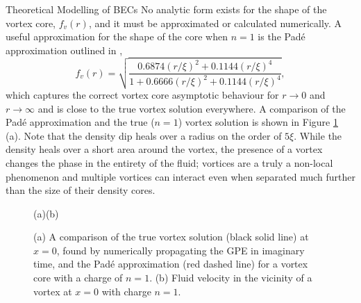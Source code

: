 \begin{chapter}{\label{cha:theoretical_model}Theoretical Modelling of BECs}
No analytic form exists for the shape of the vortex core, $f_v(r)$, and it must be approximated or calculated numerically. A useful approximation for the shape of the core when $n=1$ is the Pad\'e approximation outlined in \cite{berloff2004},
	\begin{equation}
		f_v(r) = \sqrt{\frac{0.6874(r/\xi)^2 + 0.1144(r/\xi)^4}{1+0.6666(r/\xi)^2+0.1144(r/\xi)^4}},
	\end{equation}
which captures the correct vortex core asymptotic behaviour for $r\rightarrow 0$ and $r\rightarrow\infty$ and is close to the true vortex solution everywhere. A comparison of the Pad\'e approximation and the true ($n=1$) vortex solution is shown in Figure \ref{fig_vortex} (a). Note that the density dip heals over a radius on the order of $5\xi$. While the density heals over a short area around the vortex, the presence of a vortex changes the phase in the entirety of the fluid; vortices are a truly a non-local phenomenon and multiple vortices can interact even when separated much further than the size of their density cores.

\begin{figure}[!ht]
	\hspace{-0.13\linewidth}(a)\hspace{0.45\linewidth}(b)\hspace{0.03\linewidth}\\
	\centering
  \caption{(a) A comparison of the true vortex solution (black solid line) at $x=0$, found by numerically propagating the GPE in imaginary time, and the Pad\'e approximation (red dashed line) for a vortex core with a charge of $n=1$. (b) Fluid velocity in the vicinity of a vortex at $x=0$ with charge $n=1$.}\label{fig_vortex}
 \end{figure}


\end{chapter}
